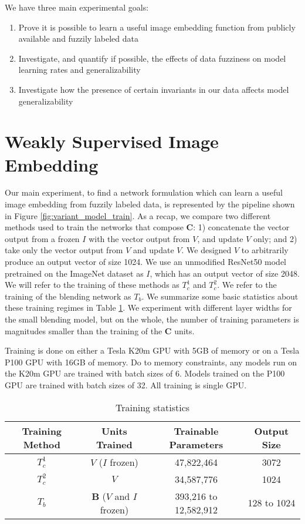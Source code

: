We have three main experimental goals:
\begin{enumerate}
	\item Prove it is possible to learn a useful image embedding function from publicly available and fuzzily labeled data
	\item Investigate, and quantify if possible, the effects of data fuzziness on model learning rates and generalizability
	\item Investigate how the presence of certain invariants in our data affects model generalizability
\end{enumerate}




\section{Weakly Supervised Image Embedding}
Our main experiment, to find a network formulation which can learn a useful image embedding from fuzzily labeled data, is represented by the pipeline shown in Figure \ref{fig:variant_model_train}. As a recap, we compare two different methods used to train the networks that compose \textbf{\textbf{C}}: 1) concatenate the vector output from a frozen $I$ with the vector output from $V$, and update $V$ only; and 2) take only the vector output from $V$ and update $V$. We designed $V$ to arbitrarily produce an output vector of size 1024. We use an unmodified ResNet50 model pretrained on the ImageNet dataset as $I$, which has an output vector of size 2048. We will refer to the training of these methods as $T_c^1$ and  $T_c^2$. We refer to the training of the blending network as $T_b$. We summarize some basic statistics about these training regimes in Table \ref{table:embedding_parameters}. We experiment with different layer widths for the small blending model, but on the whole, the number of training parameters is magnitudes smaller than the training of the \textbf{C} units.

Training is done on either a Tesla K20m GPU with 5GB of memory or on a Tesla P100 GPU with 16GB of memory. Do to memory constraints, any models run on the K20m GPU are trained with batch sizes of 6. Models trained on the P100 GPU are trained with batch sizes of 32. All training is single GPU. 

\begin{table}
	\begin{tabular}{*{4}{c}}
		\toprule
		\bfseries Training Method & \bfseries Units Trained & \bfseries Trainable Parameters & \bfseries Output Size\\
		\midrule
		$T_c^1$ & $V$ ($I$ frozen) & 47,822,464 & 3072\\
		$T_c^2$ & $V$ & 34,587,776 & 1024\\
		$T_b$ & \textbf{B} ($V$ and $I$ frozen) & 393,216 to 12,582,912 & 128 to 1024\\
		\bottomrule
	\end{tabular}
	\caption{Training statistics}
	\label{table:embedding_parameters}
\end{table}



